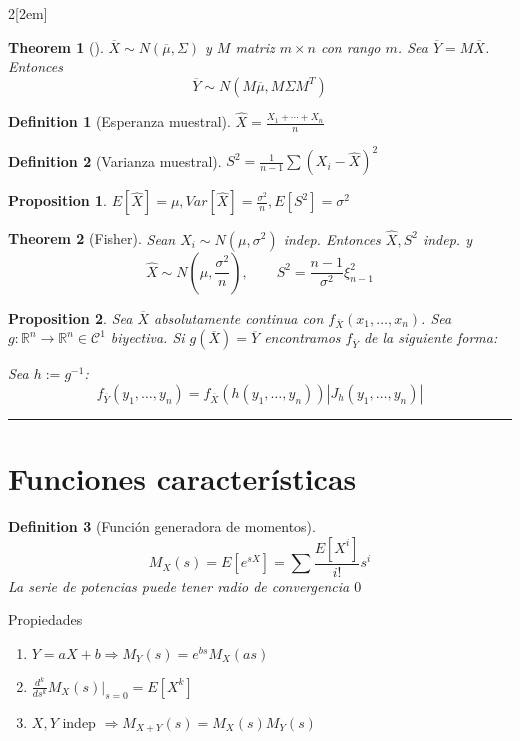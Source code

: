 \documentclass[leqno]{article}
\newtheorem*{theorem}{Theorem}
\newtheorem*{proposition}{Proposition}
\newtheorem*{definition}{Definition}
\begin{document}
\begin{multicols}{2}[\columnsep2em]
\begin{theorem}[]
$\overline{X} \sim N(\overline{\mu}, \Sigma)$ y $M$ matriz $m\times n$ con rango $m$. Sea  $\overline{Y}=M \overline{X}$. Entonces
\[
\overline{Y}\sim  N(M \overline{\mu}, M \Sigma M^T)
\] 
\end{theorem}

\begin{definition}[Esperanza muestral] $\displaystyle \hat{X} = \frac{X_1+\cdots+X_n}{n}$
\end{definition}

\begin{definition}[Varianza muestral] $\displaystyle S^2 = \frac{1}{n-1}\sum (X_i- \hat{X})^2 $
\end{definition}

\begin{proposition}
$E[\hat{X}]=\mu, Var[\hat{X}]= \frac{\sigma ^2}{n}, E[S^2]=\sigma^2$ 
\end{proposition}

\begin{theorem}[Fisher]Sean $X_i\sim N(\mu, \sigma ^2)$ indep. Entonces $\hat{X}, S^2$ indep. y
 \[
 \hat{X} \sim N\left( \mu, \frac{\sigma^2}{n}\right), \qquad S^2 = \frac{n-1}{\sigma ^2}\xi^2_{n-1}
 \] 
\end{theorem}

 \begin{proposition}
Sea $\overline{X}$ absolutamente continua con $f_{\overline{X}}(x_1,\ldots,x_n)$. Sea $g:\mathbb{R}^n\to \mathbb{R}^n \in \mathcal{C}^1$ biyectiva. Si  $g(\overline{X})=\overline{Y}$ encontramos $f_{\overline{Y}}$ de la siguiente forma:

Sea $h:=g^{-1}$:
\[
f_{\overline{Y}}(y_1, \ldots, y_n) = f_{\overline{X}}(h(y_1,\ldots,y_n))|J_h(y_1,\ldots,y_n)|
\] 
\end{proposition}
\hrule
\section{Funciones características}
\begin{definition}[Función generadora de momentos]
\[
M_X(s) = E[e^{sX}] = \sum \frac{E[X^i]}{i!}s^i
\] 
La serie de potencias puede tener radio de convergencia $0$
\end{definition}

Propiedades
\begin{enumerate}[topsep=-6pt, itemsep=0pt]
  \item $Y = aX +b \Rightarrow M_Y(s) = e^{bs}M_X(as)$
  \item $\frac{d^k}{d s^k}M_X(s)|_{s=0} = E[X^k] $
  \item $X, Y$ indep  $\Rightarrow M_{X+Y}(s) = M_X(s)M_Y(s)$
\end{enumerate}


\end{multicols}
\end{document}
